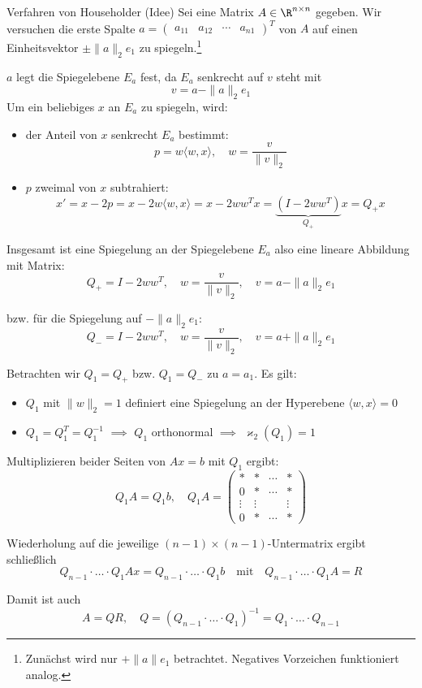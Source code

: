 \begin{bonus}{Verfahren von Householder (Idee)}
    Sei eine Matrix $A \in \R^{n \times n}$ gegeben. 
    Wir versuchen die erste Spalte $a = \begin{pmatrix} a_{11} & a_{12} & \cdots & a_{n1} \end{pmatrix}^T$ von $A$ auf einen Einheitsvektor $\pm \|a\|_2 e_1$ zu spiegeln.\footnote{Zunächst wird nur $+\|a\| e_1$ betrachtet. Negatives Vorzeichen funktioniert analog.}
    
    $a$ legt die Spiegelebene $E_a$ fest, da $E_a$ senkrecht auf $v$ steht mit
    \[
        v = a - \|a\|_2 e_1
    \]
    Um ein beliebiges $x$ an $E_a$ zu spiegeln, wird:
    \begin{itemize}
        \item der Anteil von $x$ senkrecht $E_a$ bestimmt:
              \[
                  p = w \langle w, x \rangle, \quad w = \frac{v}{\|v\|_2}
              \]
        \item $p$ zweimal von $x$ subtrahiert:
              \[ 
                  x' = x - 2 p = x - 2 w \langle w, x \rangle = x - 2 ww^T x = \underbrace{(I - 2 ww^T)}_{Q_+} x = Q_+ x
              \]
    \end{itemize}
    
    Insgesamt ist eine Spiegelung an der Spiegelebene $E_a$ also eine lineare Abbildung mit Matrix:
    \[ 
        Q_+ = I - 2 ww^T, \quad w = \frac{v}{\|v\|_2}, \quad v = a - \|a\|_2 e_1
    \]
    
    bzw. für die Spiegelung auf $-\|a\|_2 e_1$:
    \[
        Q_- = I - 2 ww^T, \quad w = \frac{v}{\|v\|_2}, \quad v = a + \|a\|_2 e_1  
    \]
    
    Betrachten wir $Q_1 = Q_+$ bzw. $Q_1 = Q_-$ zu $a = a_1$. 
    Es gilt: 
    \begin{itemize}
        \item $Q_1$ mit $\|w\|_2 = 1$ definiert eine Spiegelung an der Hyperebene $\langle w, x \rangle = 0$
        \item $Q_1 = Q_1^T = Q_1^{-1}$ $\implies$ $Q_1$ orthonormal $\implies$ $\varkappa_2(Q_1) = 1$
    \end{itemize}
    
    Multiplizieren beider Seiten von $Ax = b$ mit $Q_1$ ergibt:
    \[
        Q_1 A = Q_1 b, \quad Q_1 A = 
        \begin{pmatrix}
            *      & *      & \cdots & *      \\
            0      & *      & \cdots & *      \\
            \vdots & \vdots &        & \vdots \\
            0      & *      & \cdots & *
        \end{pmatrix}
    \]
    
    Wiederholung auf die jeweilige $(n-1) \times (n-1)$-Untermatrix ergibt schließlich
    \[ 
        Q_{n-1} \cdot \ldots \cdot Q_1 Ax = Q_{n-1} \cdot \ldots \cdot Q_1 b \quad \text{mit} \quad Q_{n-1} \cdot \ldots \cdot Q_1 A = R
    \]
    
    Damit ist auch 
    \[
        A = QR, \quad Q = (Q_{n-1} \cdot \ldots \cdot Q_1)^{-1} = Q_1 \cdot \ldots \cdot Q_{n-1}
    \]
\end{bonus}

